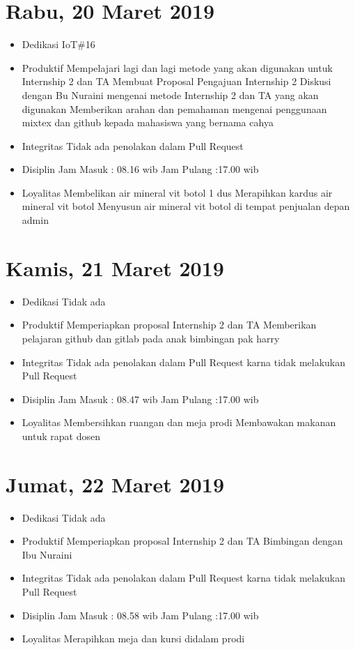 \section{Rabu, 20 Maret 2019}
\begin{itemize}
\item Dedikasi
\subitem IoT\#16
\item Produktif
  \subitem Mempelajari lagi dan lagi metode yang akan digunakan untuk Internship 2 dan TA
  \subitem Membuat Proposal Pengajuan Internship 2
  \subitem Diskusi dengan Bu Nuraini mengenai metode Internship 2 dan TA yang akan digunakan
  \subitem Memberikan arahan dan pemahaman mengenai penggunaan mixtex dan github kepada mahasiswa yang bernama cahya 
\item Integritas
  \subitem Tidak ada penolakan dalam Pull Request
\item Disiplin
  \subitem Jam Masuk : 08.16 wib
  \subitem Jam Pulang :17.00 wib
\item Loyalitas
  \subitem Membelikan air mineral vit botol 1 dus
  \subitem Merapihkan kardus  air mineral vit botol
  \subitem Menyusun  air mineral vit botol di tempat penjualan depan admin
\end{itemize}

\section{Kamis, 21 Maret 2019}
\begin{itemize}
\item Dedikasi
\subitem Tidak ada
\item Produktif
  \subitem Memperiapkan proposal Internship 2 dan TA
  \subitem Memberikan pelajaran github dan gitlab pada anak bimbingan pak harry
\item Integritas
  \subitem Tidak ada penolakan dalam Pull Request karna tidak melakukan Pull Request
\item Disiplin
  \subitem Jam Masuk : 08.47 wib
  \subitem Jam Pulang :17.00 wib
\item Loyalitas
  \subitem Membersihkan ruangan dan meja prodi
  \subitem Membawakan makanan untuk rapat dosen
\end{itemize}

\section{Jumat, 22 Maret 2019}
\begin{itemize}
\item Dedikasi
\subitem Tidak ada
\item Produktif
  \subitem Memperiapkan proposal Internship 2 dan TA
  \subitem Bimbingan dengan Ibu Nuraini
\item Integritas
  \subitem Tidak ada penolakan dalam Pull Request karna tidak melakukan Pull Request
\item Disiplin
  \subitem Jam Masuk : 08.58 wib
  \subitem Jam Pulang :17.00 wib
\item Loyalitas
  \subitem Merapihkan meja dan kursi didalam prodi
\end{itemize}

